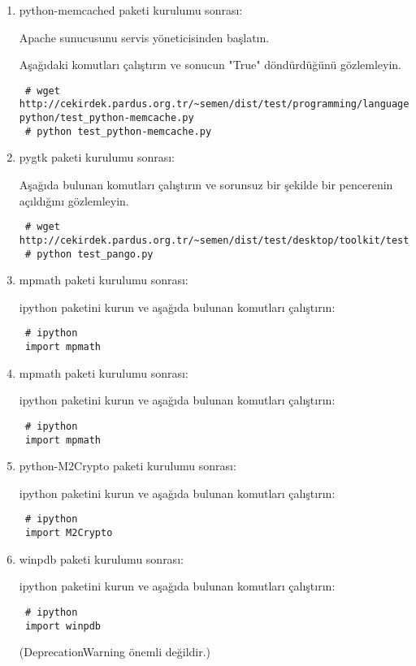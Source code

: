 \documentclass[a4paper,10pt]{article}
\begin{document}
\begin{enumerate}
\begin{itemize}
\end{itemize}

\item python-memcached paketi kurulumu sonrası:

Apache sunucusunu servis yöneticisinden başlatın.

Aşağıdaki komutları çalıştırın ve sonucun "True" döndürdüğünü gözlemleyin.
\begin{verbatim}
 # wget http://cekirdek.pardus.org.tr/~semen/dist/test/programming/language/
python/test_python-memcache.py
 # python test_python-memcache.py
\end{verbatim}

\item pygtk paketi kurulumu sonrası: 

Aşağıda bulunan komutları çalıştırın ve sorunsuz bir şekilde bir pencerenin açıldığını gözlemleyin.

\begin{verbatim}
 # wget http://cekirdek.pardus.org.tr/~semen/dist/test/desktop/toolkit/test_pango.py
 # python test_pango.py
\end{verbatim}

\item mpmath paketi kurulumu sonrası:  

ipython paketini kurun ve aşağıda bulunan komutları çalıştırın:
\begin{verbatim}
 # ipython
 import mpmath
\end{verbatim}

\item mpmath paketi kurulumu sonrası:  

ipython paketini kurun ve aşağıda bulunan komutları çalıştırın:
\begin{verbatim}
 # ipython
 import mpmath
\end{verbatim}

\item python-M2Crypto paketi kurulumu sonrası:

ipython paketini kurun ve aşağıda bulunan komutları çalıştırın:
\begin{verbatim}
 # ipython
 import M2Crypto
\end{verbatim}

\item winpdb paketi kurulumu sonrası:

ipython paketini kurun ve aşağıda bulunan komutları çalıştırın:
\begin{verbatim}
 # ipython
 import winpdb
\end{verbatim}
(DeprecationWarning önemli değildir.)


\end{enumerate}
\end{document}
